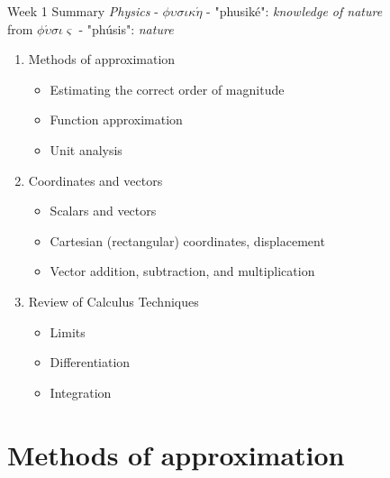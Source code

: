\documentclass{beamer}
\begin{document}
\begin{frame}{Week 1 Summary}
\textit{Physics} - $\phi\upsilon\sigma\iota\kappa\acute{\eta}$ - "phusik\'e": \textit{knowledge of nature} \\
from $\phi\acute{\upsilon}\sigma\iota\varsigma$ - "ph\'usis": \textit{nature}
\begin{enumerate}
\item Methods of approximation
\begin{itemize}
\item \alert{Estimating} the correct order of magnitude
\item \alert{Function} approximation
\item \alert{Unit analysis}
\end{itemize}
\item Coordinates and vectors
\begin{itemize}
\item \alert{Scalars} and \alert{vectors}
\item \alert{Cartesian} (rectangular) coordinates, displacement
\item \alert{Vector} addition, subtraction, and multiplication
\end{itemize}
\item Review of Calculus Techniques
\begin{itemize}
\item Limits
\item Differentiation
\item Integration
\end{itemize}
\end{enumerate}
\end{frame}

\section{Methods of approximation}
\end{document}

